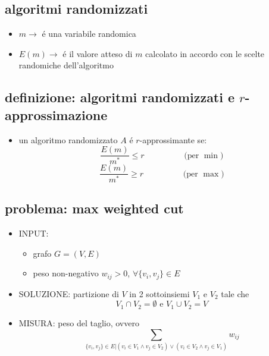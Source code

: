 
\subsection*{algoritmi randomizzati}
\begin{flushleft}
	\begin{itemize}
		\item $m\rightarrow$ \'e una variabile randomica
		\item $E(m)\rightarrow$ \'e il valore atteso di $m$ calcolato in accordo con le scelte randomiche dell'algoritmo
	\end{itemize}
\end{flushleft}


\subsection*{definizione: algoritmi randomizzati e $r$-approssimazione}
\begin{flushleft}
	\begin{itemize}
		\item un algoritmo randomizzato $A$ \'e $r$-approssimante se:
			$$\frac{E(m)}{m^*}\leq r\hspace{2cm}\text{(per }\min\text{)}$$
			$$\frac{E(m)}{m^*}\geq r\hspace{2cm}\text{(per }\max\text{)}$$
	\end{itemize}
\end{flushleft}


\subsection*{problema: max weighted cut}
\begin{flushleft}
	\begin{itemize}
		\item INPUT:
		\begin{itemize}
			\item grafo $G=(V,E)$
			\item peso non-negativo $w_{ij}>0$, $\forall\{v_i,v_j\}\in E$
		\end{itemize}
		\item SOLUZIONE: partizione di $V$ in 2 sottoinsiemi $V_1$ e $V_2$ tale che
			$$V_1\cap V_2=\emptyset\text{ e }V_1\cup V_2=V$$
		\item MISURA: peso del taglio, ovvero
			$$\sum_{\{v_i,v_j\}\in E\vert(v_i\in V_1\land v_j\in V_2)\lor(v_i\in V_2\land v_j\in V_1)}w_{ij}$$
	\end{itemize}
\end{flushleft}

